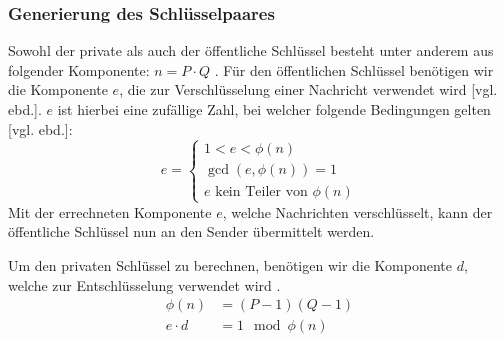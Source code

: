 \documentclass[a4paper,ngerman, headheight=28pt,12pt]{scrartcl}
\newcommand{\vcite}[1]{\cite[vgl.][]{#1}}
\newcommand{\vebd}{[vgl. ebd.]}
\begin{document}
\subsubsection{Generierung des Schlüsselpaares}
Sowohl der private als auch der öffentliche Schlüssel besteht unter anderem aus folgender Komponente: $n = P \cdot Q$ \vcite{RsaMaths1}.
Für den öffentlichen Schlüssel benötigen wir die Komponente $e$, die zur Verschlüsselung einer Nachricht verwendet wird \vebd. $e$ ist hierbei eine zufällige Zahl, bei welcher folgende Bedingungen gelten \vebd:
\begin{equation*}
  e = \begin{cases}
    1 < e < \phi(n)      \\
    \gcd(e, \phi(n)) = 1 \\
    \text{$e$ kein Teiler von $\phi(n)$}
  \end{cases}
\end{equation*}
Mit der errechneten Komponente $e$, welche Nachrichten verschlüsselt, kann der öffentliche Schlüssel nun an den Sender übermittelt werden.

Um den privaten Schlüssel zu berechnen, benötigen wir die Komponente $d$, welche zur Entschlüsselung verwendet wird \vcite{RsaEncryptionDecryption}.
\begin{equation*}
  \begin{aligned}
    \phi(n)   & = (P-1)(Q-1)     \\
    e \cdot d & = 1 \mod \phi(n)
  \end{aligned}
\end{equation*}
\end{document}
